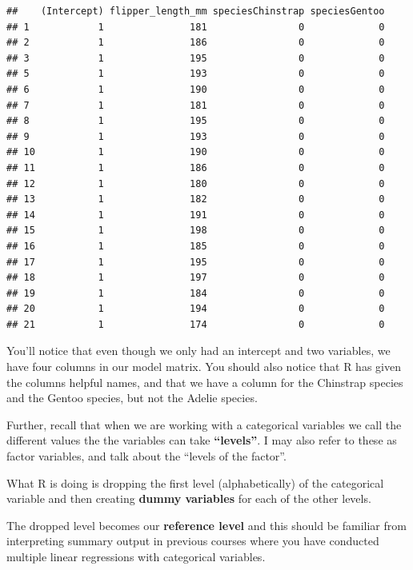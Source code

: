 \documentclass[
  openany]{book}
\begin{document}
\begin{verbatim}
##    (Intercept) flipper_length_mm speciesChinstrap speciesGentoo
## 1            1               181                0             0
## 2            1               186                0             0
## 3            1               195                0             0
## 5            1               193                0             0
## 6            1               190                0             0
## 7            1               181                0             0
## 8            1               195                0             0
## 9            1               193                0             0
## 10           1               190                0             0
## 11           1               186                0             0
## 12           1               180                0             0
## 13           1               182                0             0
## 14           1               191                0             0
## 15           1               198                0             0
## 16           1               185                0             0
## 17           1               195                0             0
## 18           1               197                0             0
## 19           1               184                0             0
## 20           1               194                0             0
## 21           1               174                0             0
\end{verbatim}

You'll notice that even though we only had an intercept and two variables, we have four columns in our model matrix. You should also notice that R has given the columns helpful names, and that we have a column for the Chinstrap species and the Gentoo species, but not the Adelie species.

Further, recall that when we are working with a categorical variables we call the different values the the variables can take \textbf{``levels''}. I may also refer to these as factor variables, and talk about the ``levels of the factor''.

What R is doing is dropping the first level (alphabetically) of the categorical variable and then creating \textbf{dummy variables} for each of the other levels.

The dropped level becomes our \textbf{reference level} and this should be familiar from interpreting summary output in previous courses where you have conducted multiple linear regressions with categorical variables.
\end{document}
